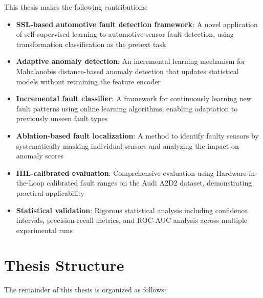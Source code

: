 This thesis makes the following contributions:

\begin{itemize}
    \item \textbf{SSL-based automotive fault detection framework}: A novel application of self-supervised learning to automotive sensor fault detection, using transformation classification as the pretext task

    \item \textbf{Adaptive anomaly detection}: An incremental learning mechanism for Mahalanobis distance-based anomaly detection that updates statistical models without retraining the feature encoder

    \item \textbf{Incremental fault classifier}: A framework for continuously learning new fault patterns using online learning algorithms, enabling adaptation to previously unseen fault types

    \item \textbf{Ablation-based fault localization}: A method to identify faulty sensors by systematically masking individual sensors and analyzing the impact on anomaly scores

    \item \textbf{HIL-calibrated evaluation}: Comprehensive evaluation using Hardware-in-the-Loop calibrated fault ranges on the Audi A2D2 dataset, demonstrating practical applicability

    \item \textbf{Statistical validation}: Rigorous statistical analysis including confidence intervals, precision-recall metrics, and ROC-AUC analysis across multiple experimental runs
\end{itemize}

\section{Thesis Structure}

The remainder of this thesis is organized as follows:

